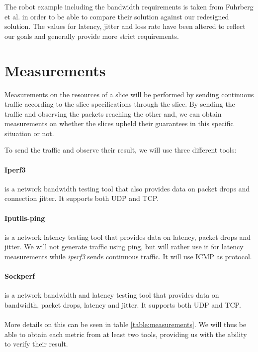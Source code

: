 The robot example including the bandwidth requirements is taken from Fuhrberg et al. \cite{SE4} in order to be able to compare their solution against our redesigned solution. The values for latency, jitter and loss rate have been altered to reflect our goals and generally provide more strict requirements.

\section{Measurements}
\label{measurements}
Measurements on the resources of a slice will be performed by sending continuous traffic according to the slice specifications through the slice. By sending the traffic and observing the packets reaching the other and, we can obtain measurements on whether the slices upheld their guarantees in this specific situation or not.

To send the traffic and observe their result, we will use three different tools:

\paragraph{Iperf3} \cite{iperf3} is a network bandwidth testing tool that also provides data on packet drops and connection jitter. It supports both UDP and TCP.

\paragraph{Iputils-ping} \cite{iputils} is a network latency testing tool that provides data on latency, packet drops and jitter. We will not generate traffic using ping, but will rather use it for latency measurements while \textit{iperf3} sends continuous traffic. It will use ICMP as protocol.

\paragraph{Sockperf} \cite{sockperf} is a network bandwidth and latency testing tool that provides data on bandwidth, packet drops, latency and jitter. It supports both UDP and TCP.

\paragraph{} More details on this can be seen in table \ref{table:measurements}. We will thus be able to obtain each metric from at least two tools, providing us with the ability to verify their result.

